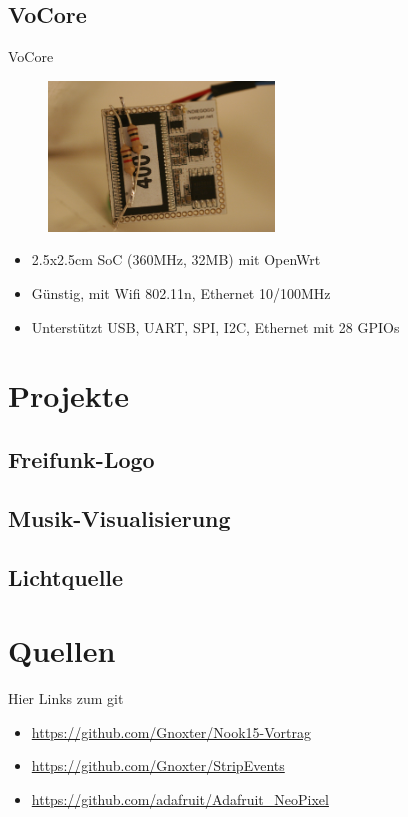 \documentclass{beamer}
\begin{document}
\subsection{VoCore}
\begin{frame}{VoCore}
\begin{figure}[h]
 \centering
 \includegraphics[width=6cm,keepaspectratio=true]{./img/_MG_4492.JPG}
\end{figure}
\begin{itemize}
 \item 2.5x2.5cm SoC (360MHz, 32MB) mit OpenWrt
 \item Günstig, mit Wifi 802.11n, Ethernet 10/100MHz
 \item Unterstützt USB, UART, SPI, I2C, Ethernet mit 28 GPIOs
\end{itemize}
\end{frame}

\section{Projekte}
\subsection{Freifunk-Logo}
\begin{frame}
\end{frame}

\subsection{Musik-Visualisierung}
\begin{frame}
\end{frame}

\subsection{Lichtquelle}
\begin{frame}
\end{frame}

\section{Quellen}
\begin{frame}
 Hier Links zum git
\begin{itemize}
 \item \url{https://github.com/Gnoxter/Nook15-Vortrag}
 \item \url{https://github.com/Gnoxter/StripEvents}
 \item \url{https://github.com/adafruit/Adafruit_NeoPixel}
\end{itemize}
\end{frame}
\end{document}

